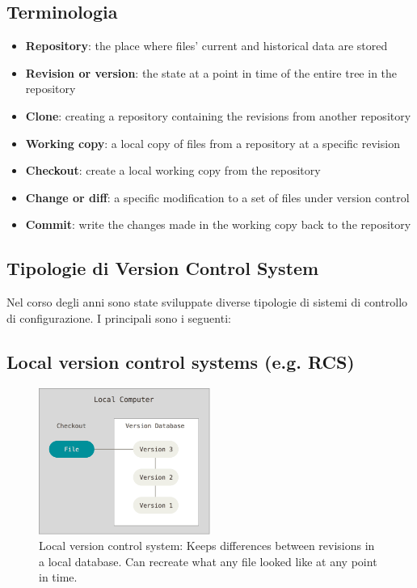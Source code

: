 \subsection{Terminologia}

  \begin{itemize}
  \renewcommand\labelitemi{--}
  \setlength\itemsep{0.1em}
  \item \textbf{Repository}: the place where files' current and historical data
    are stored
  \item \textbf{Revision or version}: the state at a point in time of the entire
    tree in the repository
  \item \textbf{Clone}: creating a repository containing the revisions from
    another repository
  \item \textbf{Working copy}: a local copy of files from a repository at a
    specific revision
  \item \textbf{Checkout}: create a local working copy from the repository
  \item \textbf{Change or diff}: a specific modification to a set of files under
    version control
  \item \textbf{Commit}: write the changes made in the working copy back to the
    repository
  \end{itemize}


\subsection{Tipologie di Version Control System}
Nel corso degli anni sono state sviluppate diverse tipologie di sistemi di controllo di configurazione. I principali sono i seguenti: \newpage


\subsection{Local version control systems (e.g. RCS)}


\begin{figure}[ht]
    \centering
    \includegraphics[width=0.5\textwidth]{lez1/localVCS.png}
    \caption{Local version control system: Keeps differences between revisions in a local database. Can recreate what any file looked like at any point in time. }
    \label{localVCS}
\end{figure}
\FloatBarrier


